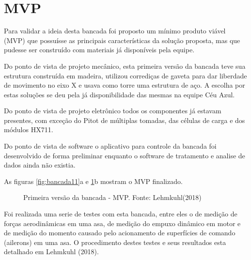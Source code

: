 \section{MVP}

Para validar a ideia desta bancada foi proposto um mínimo produto viável (MVP) que possuísse as principais características da solução proposta, mas que pudesse ser construído com materiais já disponíveis pela equipe.

Do ponto de vista de projeto mecânico, esta primeira versão da bancada teve sua estrutura construída em madeira, utilizou corrediças de gaveta para dar liberdade de movimento no eixo X e usava como torre uma estrutura de aço. A escolha por estas soluções se deu pela já disponibilidade das mesmas na equipe Céu Azul.

Do ponto de vista de projeto eletrônico todos os componentes já estavam presentes, com exceção do Pitot de múltiplas tomadas, das células de carga e dos módulos HX711.

Do ponto de vista de software o aplicativo para controle da bancada foi desenvolvido de forma preliminar enquanto o software de tratamento e analise de dados ainda não existia.

As figuras \ref{fig:bancada11}a e \ref{fig:bancada12}b mostram o MVP finalizado.

\begin{figure}[!ht]
    \centering
    \caption{Primeira versão da bancada - MVP. Fonte: Lehmkuhl(2018)}
        \label{fig:bancada11}
        \qquad
        \label{fig:bancada12}
\end{figure}

Foi realizada uma serie de testes com esta bancada, entre eles o de medição de forças aerodinâmicas em uma asa, de medição do empuxo dinâmico em motor e de medição do momento causado pelo acionamento de superfícies de comando (ailerons) em uma asa. O procedimento destes testes e seus resultados esta detalhado em Lehmkuhl (2018). 

